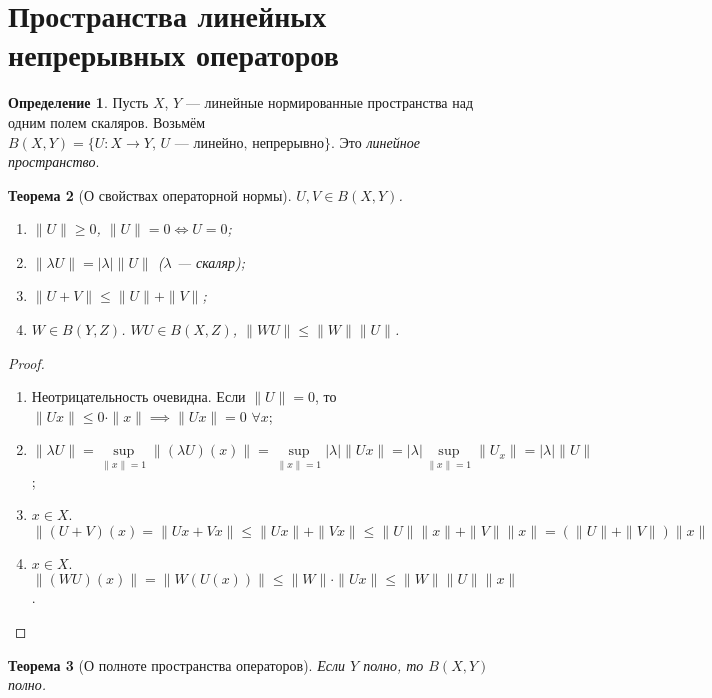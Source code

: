 \documentclass[11pt,openany,a4paper]{scrartcl}
\theoremstyle{plain}
\newtheorem{theorem}{Теорема}[section]
\theoremstyle{definition}
\newtheorem{definition}[theorem]{Определение}
\begin{document}
\section{Пространства линейных непрерывных операторов}
\begin{definition}
    Пусть $X$, $Y$ — линейные нормированные пространства над одним полем скаляров. Возьмём
    $B(X,Y) = \{U: X \to Y,\, U \text{ — линейно, непрерывно}\}$.
    Это \emph{линейное пространство}.
\end{definition}
\begin{theorem}[О свойствах операторной нормы]
    $U,V \in B(X, Y)$.
    \begin{enumerate}
        \item $\|U\| \geqslant 0$, $\|U\| = 0 \iff U = 0$;
        \item $\|\lambda U\| = |\lambda|\|U\|$ ($\lambda$ — скаляр);
        \item $\|U + V\| \leqslant \|U\| + \|V\|$;
        \item $W \in B(Y,Z)$. $WU \in B(X, Z)$, $\|WU\| \leqslant \|W\|\|U\|$.
    \end{enumerate}
\end{theorem}
\begin{proof}
\mbox{}
    \begin{enumerate}
        \item Неотрицательность очевидна. Если $\|U\|=0$, то $\|Ux\|\leqslant
        0\cdot \|x\| \implies \|Ux\| = 0$ $\forall x$;
        \item $\|\lambda U\| = \sup\limits_{\|x\|=1} \|(\lambda U)(x)\| =
         \sup\limits_{\|x\|=1} |\lambda|\|Ux\| = |\lambda| \sup\limits_{\|x\|=1}
         \|U_x\| =
         |\lambda|\|U\|$;
         \item $x \in X$. $\|(U+V)(x) = \|Ux + Vx\| \leqslant \|Ux\| + \|Vx\|
         \leqslant \|U\|\|x\| + \|V\|\|x\| = (\|U\| + \|V\|)\|x\|$
         \item $x \in X$. $\|(WU)(x)\| = \|W(U(x))\| \leqslant \|W\|\cdot \|Ux\|
         \leqslant \|W\|\|U\|\|x\|$.
    \end{enumerate}
\end{proof}
\begin{theorem}[О полноте пространства операторов]
    Если $Y$ полно, то $B(X, Y)$ полно.
\end{theorem}
\end{document}
